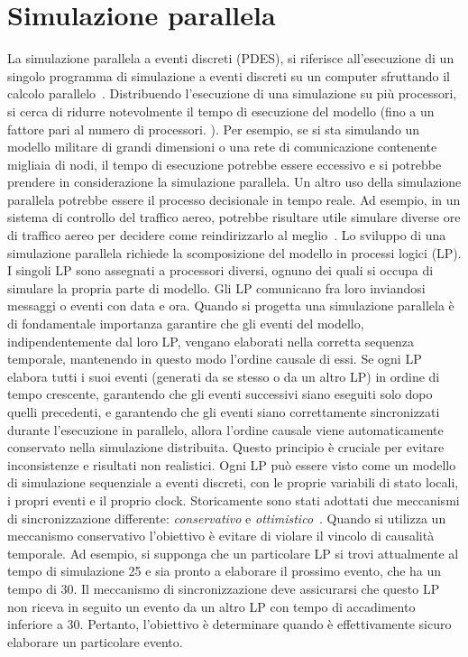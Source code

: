 \section{Simulazione parallela}
La simulazione parallela a eventi discreti (PDES), si riferisce all'esecuzione di un singolo programma di simulazione a eventi discreti su un computer sfruttando il calcolo parallelo~\cite{DBLP:journals/cacm/Fujimoto90}. Distribuendo l'esecuzione di una simulazione su più processori, si cerca di ridurre notevolmente il tempo di esecuzione del modello (fino a un fattore pari al numero di processori. ). Per esempio, se si sta simulando un modello militare di grandi dimensioni o una rete di comunicazione contenente migliaia di nodi, il tempo di esecuzione potrebbe essere eccessivo e si potrebbe prendere in considerazione la simulazione parallela. Un altro uso della simulazione parallela potrebbe essere il processo decisionale in tempo reale. Ad esempio, in un sistema di controllo del traffico aereo, potrebbe risultare utile simulare diverse ore di traffico aereo per decidere come reindirizzarlo al meglio~\cite{DBLP:conf/wsc/Wieland98}. 
Lo sviluppo di una simulazione parallela richiede la scomposizione del modello in processi logici (LP). I singoli LP sono assegnati a processori diversi, ognuno dei quali si occupa di simulare la propria parte di modello. Gli LP comunicano fra loro inviandosi messaggi o eventi con data e ora.
Quando si progetta una simulazione parallela è di fondamentale importanza garantire che gli eventi del modello, indipendentemente dal loro LP, vengano elaborati nella corretta sequenza temporale, mantenendo in questo modo l'ordine causale di essi. Se ogni LP elabora tutti i suoi eventi (generati da se stesso o da un altro LP) in ordine di tempo crescente, garantendo che gli eventi successivi siano eseguiti solo dopo quelli precedenti, e garantendo che gli eventi siano correttamente sincronizzati durante l'esecuzione in parallelo, allora l'ordine causale viene automaticamente conservato nella simulazione distribuita. Questo principio è cruciale per evitare inconsistenze e risultati non realistici.
Ogni LP può essere visto come un modello di simulazione sequenziale a eventi discreti, con le proprie variabili di stato locali, i propri eventi e il proprio clock.
Storicamente sono stati adottati due meccanismi di sincronizzazione differente: \textit{conservativo} e \textit{ottimistico}~\cite{DBLP:conf/wsc/Fujimoto95}.
Quando si utilizza un meccanismo conservativo l'obiettivo è evitare di violare il vincolo di causalità temporale. Ad esempio, si supponga che un particolare LP si trovi attualmente al tempo di simulazione 25 e sia pronto a elaborare il prossimo evento, che ha un tempo di 30. Il meccanismo di sincronizzazione deve assicurarsi che questo LP non riceva in seguito un evento da un altro LP con tempo di accadimento inferiore a 30. Pertanto, l'obiettivo è determinare quando è effettivamente sicuro elaborare un particolare evento. 
